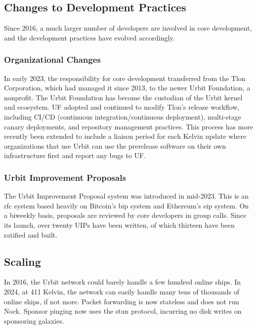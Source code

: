 \documentclass[twoside]{article}
\begin{document}
\subsection{Changes to Development Practices}

Since 2016, a much larger number of developers are involved in core development, and the development practices have evolved accordingly.

\subsubsection{Organizational Changes}

In early 2023, the responsibility for core development transferred from the Tlon Corporation, which had managed it since 2013, to the newer Urbit Foundation, a nonprofit.  The Urbit Foundation has become the custodian of the Urbit kernel and ecosystem.  UF adopted and continued to modify Tlon's release workflow, including CI/CD (continuous integration/continuous deployment), multi-stage canary deployments, and repository management practices.  This process has more recently been extended to include a liaison period for each Kelvin update where organizations that use Urbit can use the prerelease software on their own infrastructure first and report any bugs to UF.

\subsubsection{Urbit Improvement Proposals}

The Urbit Improvement Proposal system was introduced in mid-2023.  This is an {\sc rfc} system based heavily on Bitcoin's {\sc bip} system and Ethereum's {\sc eip} system.  On a biweekly basis, proposals are reviewed by core developers in group calls.  Since its launch, over twenty UIPs have been written, of which thirteen have been ratified and built.

\subsection{Scaling}

In 2016, the Urbit network could barely handle a few hundred online ships.  In 2024, at 411 Kelvin, the network can easily handle many tens of thousands of online ships, if not more.  Packet forwarding is now stateless and does not run Nock.  Sponsor pinging now uses the {\sc stun} protocol, incurring no disk writes on sponsoring galaxies.
\end{document}
